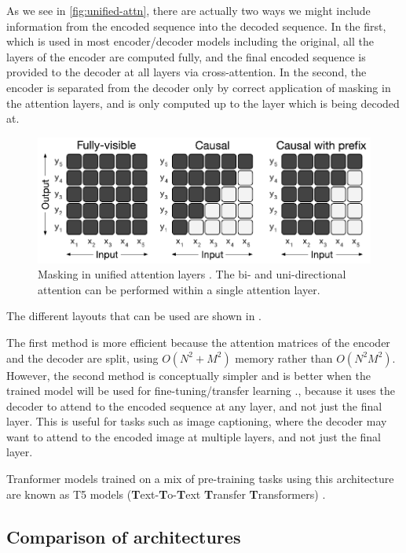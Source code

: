 As we see in \ref{fig:unified-attn}, there are actually two ways we might include information from the encoded sequence into the decoded sequence. In the first, which is used in most encoder/decoder models including the original, all the layers of the encoder are computed fully, and the final encoded sequence is provided to the decoder at all layers via cross-attention. In the second, the encoder is separated from the decoder only by correct application of masking in the attention layers, and is only computed up to the layer which is being decoded at.

\begin{figure}
    \includegraphics[width=\linewidth]{figures/attention_masks.pdf}
    \caption[Attention Masks]{Masking in unified attention layers \cite{unilm,t5}. The bi- and uni-directional attention can be performed within a single attention layer.}
    \label{fig:unified-masking}
\end{figure}

The different layouts that can be used are shown in .

The first method is more efficient because the attention matrices of the encoder and the decoder are split, using $O(N^2 +M^2)$ memory rather than $O(N^2M^2)$. However, the second method is conceptually simpler and is better when the trained model will be used for fine-tuning/transfer learning \cite{t5}., because it uses the  decoder to attend to the encoded sequence at any layer, and not just the final layer. This is useful for tasks such as image captioning, where the decoder may want to attend to the encoded image at multiple layers, and not just the final layer.

Tranformer models trained on a mix of pre-training tasks using this architecture are known as T5 models (\textbf{T}ext-\textbf{T}o-\textbf{T}ext \textbf{T}ransfer \textbf{T}ransformers) \cite{t5}.

\subsection{Comparison of architectures}

